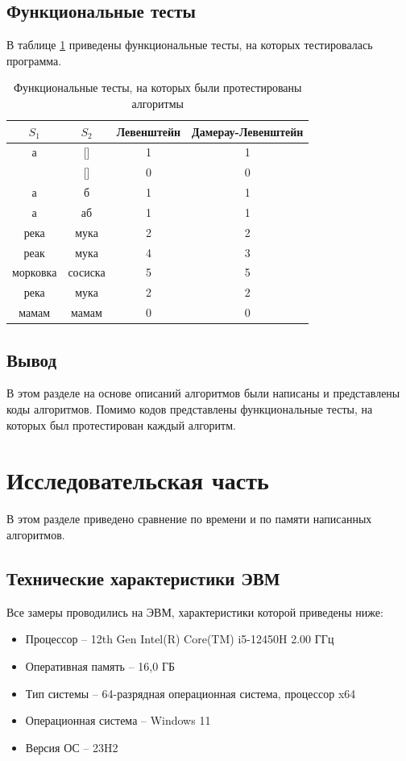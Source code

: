 \documentclass{article}
\begin{document}
\clearpage\subsection{Функциональные тесты}
В таблице \ref{tbl:func_test} приведены функциональные тесты, на которых тестировалась программа.
\begin{table}[h]
	\begin{center}
	\caption{\label{tbl:func_test} Функциональные тесты, на которых были протестированы алгоритмы}
	\begin{tabular}{|c|c|c|c|}
		\hline
		$S_{1}$ & $S_{2}$ & Левенштейн &  Дамерау-Левенштейн
		\\ \hline
		а & [] & 1 & 1  
		\\ \hline
		[] & [] & 0 & 0                             
		\\ \hline
		а & б & 1 & 1 
		\\ \hline
		а & аб & 1 & 1 
		\\ \hline
		река & мука & 2 & 2 
		\\ \hline
		реак & мука & 4 & 3 
		\\ \hline
		морковка & сосиска & 5 & 5 
		\\ \hline
		река & мука & 2 & 2 
		\\ \hline
		мамам & мамам & 0 & 0 
		\\ \hline
	\end{tabular}
	\end{center}
\end{table}

\subsection{Вывод}
В этом разделе на основе описаний алгоритмов были написаны и представлены коды алгоритмов. Помимо кодов
представлены функциональные тесты, на которых был протестирован каждый алгоритм.


\clearpage\section{Исследовательская часть}
В этом разделе приведено сравнение по времени и по памяти написанных алгоритмов.

\subsection{Технические характеристики ЭВМ}
Все замеры проводились на ЭВМ, характеристики которой приведены ниже:
\begin{itemize}
	\item Процессор -- 12th Gen Intel(R) Core(TM) i5-12450H   2.00 ГГц
	\item Оперативная память -- 16,0 ГБ
	\item Тип системы -- 64-разрядная операционная система, процессор x64
	\item Операционная система -- Windows 11
	\item Версия ОС -- 23H2
\end{itemize}
\end{document}
